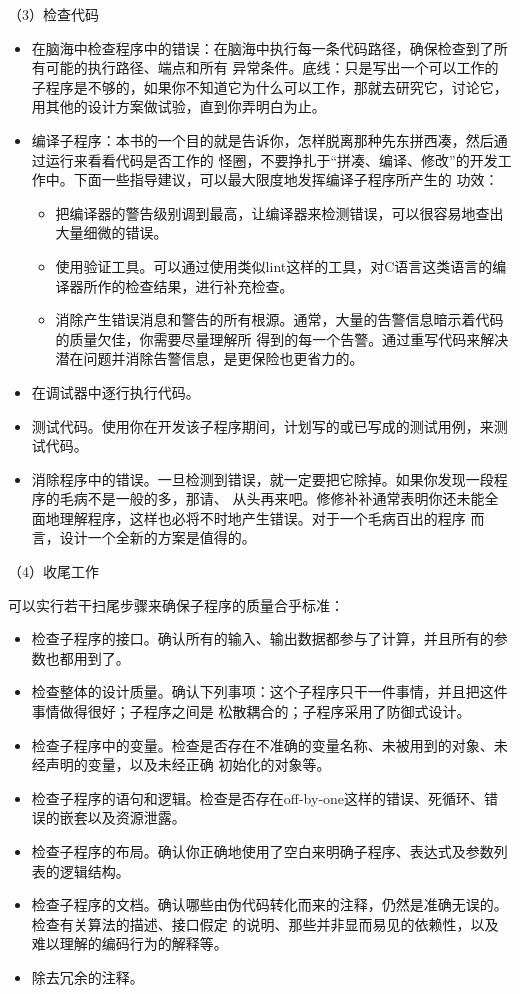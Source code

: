 \documentclass{article}
\begin{document}
\par
（3）检查代码
\par
\begin{itemize}
    \item 在脑海中检查程序中的错误：在脑海中执行每一条代码路径，确保检查到了所有可能的执行路径、端点和所有
    异常条件。底线：只是写出一个可以工作的子程序是不够的，如果你不知道它为什么可以工作，那就去研究它，讨论它，
    用其他的设计方案做试验，直到你弄明白为止。
    \item 编译子程序：本书的一个目的就是告诉你，怎样脱离那种先东拼西凑，然后通过运行来看看代码是否工作的
    怪圈，不要挣扎于“拼凑、编译、修改”的开发工作中。下面一些指导建议，可以最大限度地发挥编译子程序所产生的
    功效：
    \begin{itemize}
        \item 把编译器的警告级别调到最高，让编译器来检测错误，可以很容易地查出大量细微的错误。
        \item 使用验证工具。可以通过使用类似lint这样的工具，对C语言这类语言的编译器所作的检查结果，进行补充检查。
        \item 消除产生错误消息和警告的所有根源。通常，大量的告警信息暗示着代码的质量欠佳，你需要尽量理解所
        得到的每一个告警。通过重写代码来解决潜在问题并消除告警信息，是更保险也更省力的。
    \end{itemize}
    \item 在调试器中逐行执行代码。
    \item 测试代码。使用你在开发该子程序期间，计划写的或已写成的测试用例，来测试代码。
    \item 消除程序中的错误。一旦检测到错误，就一定要把它除掉。如果你发现一段程序的毛病不是一般的多，那请、
    从头再来吧。修修补补通常表明你还未能全面地理解程序，这样也必将不时地产生错误。对于一个毛病百出的程序
    而言，设计一个全新的方案是值得的。
\end{itemize}

\par
（4）收尾工作
\par
可以实行若干扫尾步骤来确保子程序的质量合乎标准：
\begin{itemize}
    \item 检查子程序的接口。确认所有的输入、输出数据都参与了计算，并且所有的参数也都用到了。
    \item 检查整体的设计质量。确认下列事项：这个子程序只干一件事情，并且把这件事情做得很好；子程序之间是
    松散耦合的；子程序采用了防御式设计。
    \item 检查子程序中的变量。检查是否存在不准确的变量名称、未被用到的对象、未经声明的变量，以及未经正确
    初始化的对象等。
    \item 检查子程序的语句和逻辑。检查是否存在off-by-one这样的错误、死循环、错误的嵌套以及资源泄露。
    \item 检查子程序的布局。确认你正确地使用了空白来明确子程序、表达式及参数列表的逻辑结构。
    \item 检查子程序的文档。确认哪些由伪代码转化而来的注释，仍然是准确无误的。检查有关算法的描述、接口假定
    的说明、那些并非显而易见的依赖性，以及难以理解的编码行为的解释等。
    \item 除去冗余的注释。
\end{itemize}
\end{document}
